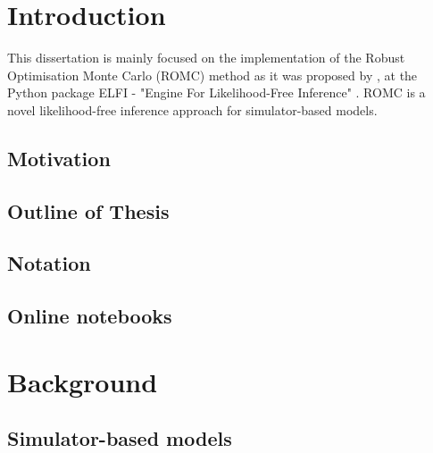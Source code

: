 \documentclass[11pt,twoside]{article}
\numberwithin{Theorem}{section}
\numberwithin{Definition}{section}
\numberwithin{Lemma}{section}
\numberwithin{Algorithm}{section}
\numberwithin{equation}{section}
\begin{document}
\tableofcontents
\clearpage
\listoftables
\listoffigures
\cleardoublepage

\setcounter{page}{1}

\nocite{*}
\clearpage


\section{Introduction}
\label{sec:introduction}
This dissertation is mainly focused on the implementation of the
Robust Optimisation Monte Carlo (ROMC) method as it was proposed by
\autocite{Ikonomov2019}, at the Python package ELFI - "Engine For
Likelihood-Free Inference" \autocite{1708.00707}. ROMC is a novel
likelihood-free inference approach for simulator-based models.

\subsection{Motivation}
\label{subsec:motivation}
% 


\subsection{Outline of Thesis}
\label{subsec:outline-of-thesis}
% 


\subsection{Notation}
\label{subsec:notation}
% 


\subsection{Online notebooks}
\label{subsec:notebooks}
% 

\clearpage


\section{Background}
\label{sec:background}

\subsection{Simulator-based models}
% 

\end{document}
